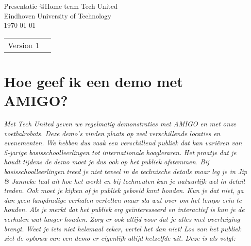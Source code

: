 \documentclass[a4paper,10pt]{article}
\numberwithin{equation}{section}
\numberwithin{figure}{section}
\numberwithin{table}{section}
\begin{document}
\begin{titlepage}

\begin{center}
\vspace{15mm}
\end{center}

\begin{figure}[H]
\centering
\end{figure}

\begin{center}
\vspace{10mm}
{\Huge Presentatie @Home team Tech United}\\
\vspace{3mm}
{\Large Eindhoven University of Technology}\\
\vspace{10mm}
\vspace{3mm}
\today
\end{center}

\vfill


\begin{tabular}{l l}
Version 1\\
\end{tabular}

\end{titlepage}

\section*{Hoe geef ik een demo met AMIGO?}
\textit{Met Tech United geven we regelmatig demonstraties met AMIGO en met onze voetbalrobots. Deze demo’s vinden plaats op veel verschillende locaties en evenementen. We hebben dus vaak een verschillend publiek dat kan variëren van 5-jarige basisschoolleerlingen tot internationale hoogleraren. Het praatje dat je houdt tijdens de demo moet je dus ook op het publiek afstemmen. Bij basisschoolleerlingen treed je niet teveel in de technische details maar leg je in Jip \& Janneke taal uit hoe het werkt en bij techneuten kun je natuurlijk wel in detail treden. Ook moet je kijken of je publiek geboeid kunt houden. Kun je dat niet, ga dan geen langdradige verhalen vertellen maar sla wat over om het tempo erin te houden. Als je merkt dat het publiek erg geïnteresseerd en interactief is kun je de verhalen wat langer houden. Zorg er ook altijd voor dat je alles met overtuiging brengt. Weet je iets niet helemaal zeker, vertel het dan niet! Los van het publiek ziet de opbouw van een demo er eigenlijk altijd hetzelfde uit. Deze is als volgt:}
\end{document}
